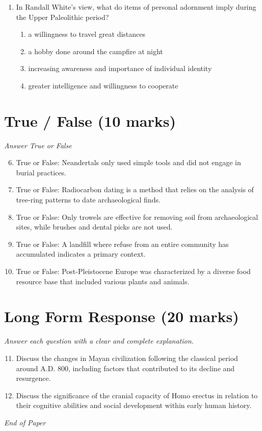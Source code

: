 \documentclass[12pt]{article}
\begin{document}
\begin{enumerate}[label=\arabic*.]
\begin{enumerate}[label=(\alph*)]
    \item Erectus possessed a larger brain.
    \item Erectus was a relatively short-lived species.
\end{enumerate}
\item In Randall White's view, what do items of personal adornment imply during the Upper Paleolithic period?
\begin{enumerate}[label=(\alph*)]
    \item a willingness to travel great distances
    \item a hobby done around the campfire at night
    \item increasing awareness and importance of individual identity
    \item greater intelligence and willingness to cooperate
\end{enumerate}
\end{enumerate}

\section*{True / False (10 marks)}
\textit{Answer True or False}
\begin{enumerate}[label=\arabic*.]
\setcounter{enumi}{5}
\item True or False: Neandertals only used simple tools and did not engage in burial practices.
\item True or False: Radiocarbon dating is a method that relies on the analysis of tree-ring patterns to date archaeological finds.
\item True or False: Only trowels are effective for removing soil from archaeological sites, while brushes and dental picks are not used.
\item True or False: A landfill where refuse from an entire community has accumulated indicates a primary context.
\item True or False: Post-Pleistocene Europe was characterized by a diverse food resource base that included various plants and animals.
\end{enumerate}

\section*{Long Form Response (20 marks)}
\textit{Answer each question with a clear and complete explanation.}
\begin{enumerate}[label=\arabic*.]
\setcounter{enumi}{10}
\item Discuss the changes in Mayan civilization following the classical period around A.D. 800, including factors that contributed to its decline and resurgence.
\item Discuss the significance of the cranial capacity of Homo erectus in relation to their cognitive abilities and social development within early human history.
\end{enumerate}

\vfill
\noindent\textit{End of Paper}
\end{document}

